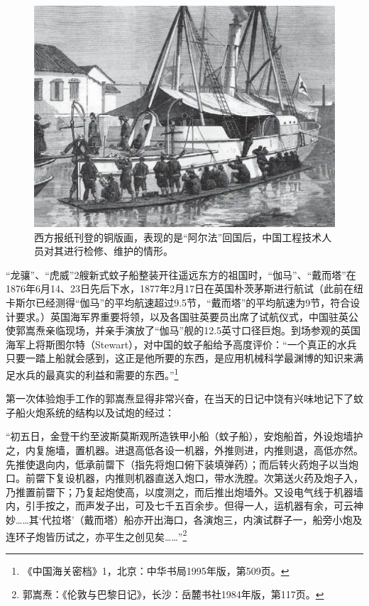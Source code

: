 \documentclass[12pt,UTF8]{ctexbook}
\begin{document}
\begin{figure}[htbp]
	\centering
	\includegraphics[width=1\linewidth]{Images/8}
	\caption{西方报纸刊登的铜版画，表现的是“阿尔法”回国后，中国工程技术人员对其进行检修、维护的情形。}
	\label{fig:1}
\end{figure}

“龙骧”、“虎威”2艘新式蚊子船整装开往遥远东方的祖国时，“伽马”、“戴而塔”在1876年6月14、23日先后下水，1877年2月17日在英国朴茨茅斯进行航试（此前在纽卡斯尔已经测得“伽马”的平均航速超过9.5节，“戴而塔”的平均航速为9节，符合设计要求。）英国海军界重要将领，以及各国驻英要员出席了试航仪式，中国驻英公使郭嵩焘亲临现场，并亲手演放了“伽马”舰的12.5英寸口径巨炮。到场参观的英国海军上将斯图尔特（Stewart），对中国的蚊子船给予高度评价：“一个真正的水兵只要一踏上船就会感到，这正是他所要的东西，是应用机械科学最渊博的知识来满足水兵的最真实的利益和需要的东西。”\footnote{《中国海关密档》1，北京：中华书局1995年版，第509页。}

第一次体验炮手工作的郭嵩焘显得非常兴奋，在当天的日记中饶有兴味地记下了蚊子船火炮系统的结构以及试炮的经过：

“初五日，金登干约至波斯莫斯观所造铁甲小船（蚊子船），安炮船首，外设炮墙护之，内复施墙，置机器。进退高低各设一机器，外推则进，内推则退，高低亦然。先推使退向内，低承前罶下（指先将炮口俯下装填弹药）；而后转火药炮子以当炮口。前罶下复设机器，内推则机器直送入炮口，带水洗膛。次第送火药及炮子入，乃推置前罶下；乃复起炮使高，以度测之，而后推出炮墙外。又设电气线于机器墙内，引手按之，而声发子出，可及七千五百余步。但得一人，运机器有余，可云神妙……其‘代拉塔’（戴而塔）船亦开出海口，各演炮三，内演试群子一，船旁小炮及连环子炮皆历试之，亦平生之创见矣……”\footnote{郭嵩焘：《伦敦与巴黎日记》，长沙：岳麓书社1984年版，第117页。}
\end{document}
